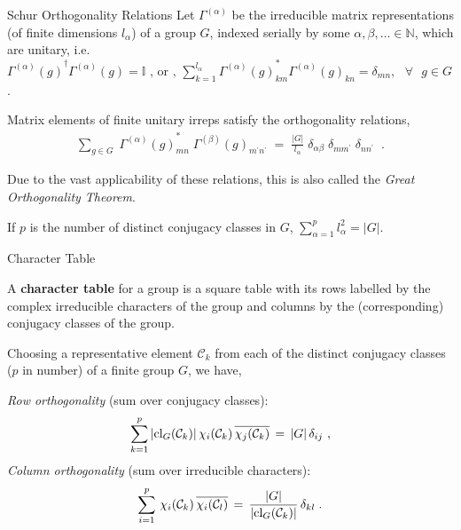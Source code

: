 \documentclass{beamer}
\newcommand\boldtext[1]{\textcolor{bolds}{\textbf{#1}}}
\newcommand\italictext[1]{\textcolor{italics}{\textit{#1}}}
\begin{document}
\begin{frame}{Schur Orthogonality Relations}
    Let $\Gamma^{(\alpha)}$ be the irreducible matrix representations (of finite dimensions ${l_\alpha}$) of a group $G$, indexed serially by some $\alpha,\beta,\dotsc\in\mathbb{N}$, which are unitary, i.e. ${\Gamma^{(\alpha)}(g)}^{\dagger}\Gamma^{(\alpha)}(g)=\mathbb{I}\text{ ,  or , }\sum\limits_{k=1}^{l_\alpha}{\Gamma^{(\alpha)}(g)}_{km}^*\Gamma^{(\alpha)}(g)_{kn}=\delta_{mn},\text{ }\forall\text{ }g\in G$ .
    \begin{theorem}
        Matrix elements of finite unitary irreps satisfy the orthogonality relations,
        \vspace{-0.75em}
        \begin{align*}
            \sum\limits_{g\in G}\;{\Gamma^{(\alpha)}(g)}_{mn}^*\;\Gamma^{(\beta)}(g)_{m^\prime n^\prime}\;=\;\frac{\lvert G\rvert}{l_\alpha}\; \delta_{\alpha\beta}\;\delta_{mm^\prime}\;\delta_{nn^\prime}\;\;. 
        \end{align*}
    \end{theorem}
    Due to the vast applicability of these relations, this is also called the \italictext{Great Orthogonality Theorem}.
    \begin{corollary}
        If $p$ is the number of distinct conjugacy classes in $G$, $\sum\limits_{\alpha=1}^{p} l_\alpha^2=\lvert G\rvert$.
    \end{corollary}
\end{frame}

\begin{frame}{Character Table}
    \begin{definition}
        A \boldtext{character table} for a group is a square table with its rows labelled by the complex irreducible characters of the group and columns by the (corresponding) conjugacy classes of the group. 
    \end{definition}
    Choosing a representative element $\mathcal{C}_k$ from each of the distinct conjugacy classes ($p$ in number) of a finite group $G$, we have,
    \begin{theorem}
        \italictext{Row orthogonality} (sum over conjugacy classes):
        \vspace{-0.75em}
        \begin{align*}
            \sum\limits_{k=1}^{p}\,\lvert\textup{cl}_G(\mathcal{C}_k)\rvert\,\chi_i(\mathcal{C}_k)\,\overline{\chi_j(\mathcal{C}_k)}\,=\,\lvert G\rvert\,\delta_{ij} \,\,,
        \end{align*}
        \italictext{Column orthogonality} (sum over irreducible characters):
        \vspace{-0.75em}
        \begin{align*}
            \sum\limits_{i=1}^{p}\,\chi_i(\mathcal{C}_k)\,\overline{\chi_i(\mathcal{C}_l)}\,=\,\frac{\lvert G\rvert} {\lvert\textup{cl}_G(\mathcal{C}_k) \rvert}\,\delta_{kl} \;.
        \end{align*}
    \end{theorem}
\end{frame}
\end{document}
